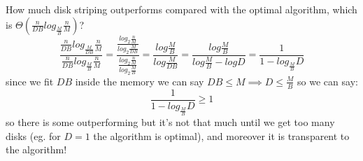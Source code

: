How much disk striping outperforms compared with the optimal algorithm, which is $\Theta \left( \frac{n}{DB} log_{\frac{M}{B}} \frac{n}{M} \right)$?
$$
    \frac{ \frac{n}{DB} log_{\frac{M}{DB}} \frac{n}{M} }{ \frac{n}{DB} log_{\frac{M}{B}} \frac{n}{M} } = \frac{ \frac{log_2 \frac{n}{M}}{log_2 \frac{M}{DB}} }{ \frac{log_2 \frac{n}{M}}{log_2 \frac{M}{B}} } = \frac{ log \frac{M}{B} }{ log \frac{M}{DB} } = \frac{ log \frac{M}{B} }{ log \frac{M}{B} - log D } = \frac{1}{1 - log_{ \frac{M}{B} } D}
$$
since we fit $DB$ inside the memory we can say $DB \leq M \implies D \leq \frac{M}{B}$ so we can say:
$$
    \frac{1}{1 - log_{ \frac{M}{B} } D} \geq 1
$$
so there is some outperforming but it's not that much until we get too many disks (eg. for $D=1$ the algorithm is optimal), and moreover it is transparent to the algorithm!

